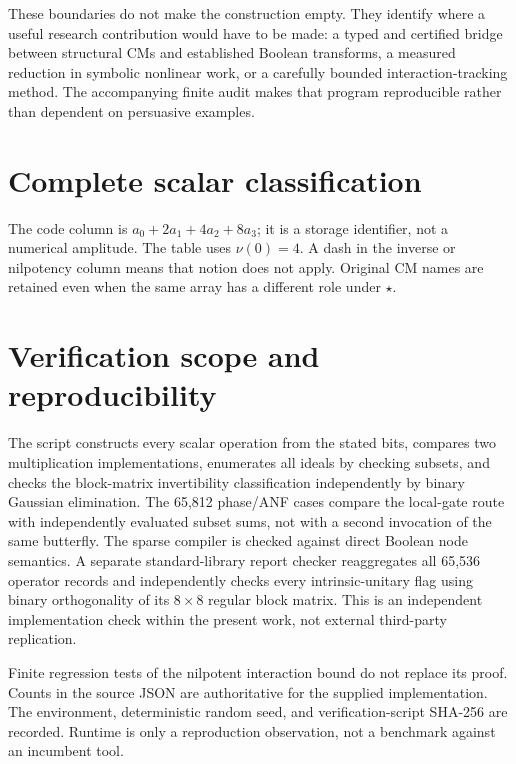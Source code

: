 \documentclass[11pt,a4paper]{article}
\theoremstyle{definition}\newtheorem{definition}[theorem]{Definition}
\theoremstyle{remark}\newtheorem{remark}[theorem]{Remark}
\numberwithin{equation}{section}
\begin{document}
These boundaries do not make the construction empty. They identify where a useful research contribution would have to be made: a typed and certified bridge between structural CMs and established Boolean transforms, a measured reduction in symbolic nonlinear work, or a carefully bounded interaction-tracking method. The accompanying finite audit makes that program reproducible rather than dependent on persuasive examples.

\appendix
\section{Complete scalar classification}\label{app:scalars}

The code column is $a_0+2a_1+4a_2+8a_3$; it is a storage identifier, not a numerical amplitude. The table uses $\nu(0)=4$. A dash in the inverse or nilpotency column means that notion does not apply. Original CM names are retained even when the same array has a different role under $\star$.

\section{Verification scope and reproducibility}\label{app:audit}

The script constructs every scalar operation from the stated bits, compares two multiplication implementations, enumerates all ideals by checking subsets, and checks the block-matrix invertibility classification independently by binary Gaussian elimination. The 65,812 phase/ANF cases compare the local-gate route with independently evaluated subset sums, not with a second invocation of the same butterfly. The sparse compiler is checked against direct Boolean node semantics. A separate standard-library report checker reaggregates all 65,536 operator records and independently checks every intrinsic-unitary flag using binary orthogonality of its $8\times8$ regular block matrix. This is an independent implementation check within the present work, not external third-party replication.

Finite regression tests of the nilpotent interaction bound do not replace its proof. Counts in the source JSON are authoritative for the supplied implementation. The environment, deterministic random seed, and verification-script SHA-256 are recorded. Runtime is only a reproduction observation, not a benchmark against an incumbent tool.
\end{document}
